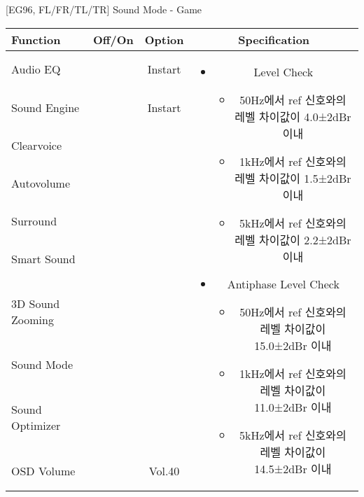 \begin{frame}[t]{[EG96, FL/FR/TL/TR] Sound Mode - Game}
\begin{tiny}
\begin{tabular}{@{}lccc@{}}
\toprule
Function & Off/On & Option & Specification \\
\midrule
Audio EQ & \color{black}{Off} & Instart &
\multirow{10}{60mm}{
\begin{itemize}
\item Level Check
  \begin{itemize}
  \item 50Hz에서 ref 신호와의 레벨 차이값이 4.0±2dBr 이내
  \item 1kHz에서 ref 신호와의 레벨 차이값이 1.5±2dBr 이내
  \item 5kHz에서 ref 신호와의 레벨 차이값이 2.2±2dBr 이내
  \end{itemize}
\item Antiphase Level Check
  \begin{itemize}
  \item 50Hz에서 ref 신호와의 레벨 차이값이 15.0±2dBr 이내
  \item 1kHz에서 ref 신호와의 레벨 차이값이 11.0±2dBr 이내
  \item 5kHz에서 ref 신호와의 레벨 차이값이 14.5±2dBr 이내
  \end{itemize}
\end{itemize}
} \\
Sound Engine & \color{blue}{On} & Instart & \\
Clearvoice & \color{black}{Off} & & \\
Autovolume & \color{black}{Off} & & \\
Surround & \color{black}{Off} & & \\
Smart Sound & \color{black}{Off} & & \\
3D Sound Zooming & \color{black}{Off} & & \\
Sound Mode & \color{blue}{On} & \color{blue}{Game} & \\
Sound Optimizer & \color{black}{Off} & & \\
OSD Volume & \color{blue}{On} & Vol.40 & \\
\midrule
\end{tabular}
\end{tiny}

\end{frame}

